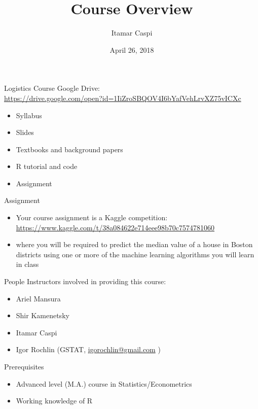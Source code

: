 \documentclass[aspectratio=169]{beamer}
\title{{\large Course Overview}}
\date{April 26, 2018}
\author{Itamar Caspi}
\institute{ml4e @ HUJI, 2018}
\begin{document}
\maketitle

\begin{frame}{Logistics}
Course Google Drive:\\
\url{https://drive.google.com/open?id=1IiZroSBQOV4I6bYafVehLrvXZ75vICXc}
\begin{itemize}
\item Syllabus
\item Slides
\item Textbooks and background papers
\item R tutorial and code
\item Assignment
\end{itemize}
\end{frame}

\begin{frame}{Assignment}
\begin{itemize}
\item Your course assignment is a Kaggle competition:
\url{https://www.kaggle.com/t/38a084622e714eee98b70c7574781060}
\item where you will be required to predict the median value of a house in Boston districts using one or more of the machine learning algorithms you will learn in class
\end{itemize}
\end{frame}

\begin{frame}{People}
Instructors involved in providing this course:
\begin{itemize}
\item Ariel Mansura
\item Shir Kamenetsky
\item Itamar Caspi
\item Igor Rochlin (GSTAT, \url{igorochlin@gmail.com} )
\end{itemize}
\end{frame}

\begin{frame}{Prerequisites}
\begin{itemize}
\item Advanced level (M.A.) course in Statistics/Econometrics
\item Working knowledge of R
\end{itemize}

\end{frame}
\end{document}
